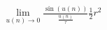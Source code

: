 \documentclass[preview]{standalone}
\begin{document}
\begin{align*}
\lim_{u(n) \to 0} \frac {\sin \left(u(n)\right)} {\frac {u(n)}{\tau} } \frac {1} {2} r^2
\end{align*}
\end{document}
